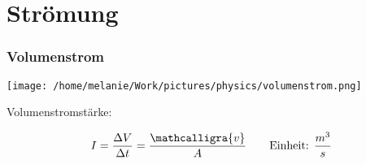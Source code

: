 \documentclass{beamer}
\begin{document}


















\section{Strömung}








\begin{frame}
\frametitle{Volumenstrom}


\begin{center}
\texttt{[image: /home/melanie/Work/pictures/physics/volumenstrom.png]}
\end{center}

Volumenstromstärke:
 
\[
I = \frac{\Delta V}{\Delta t} = \frac{\mathcalligra{v}}{A}  \qquad \text{Einheit: } \frac{m^3}{s}
\]

\end{frame}
\end{document}
